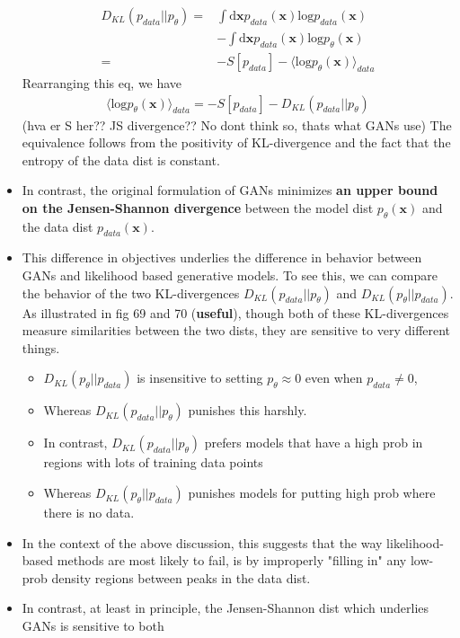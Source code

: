 \documentclass[norsk,a4paper,11pt]{article}
\begin{document}
\begin{itemize}
\begin{align}
		D_{KL} (p_{data}||p_\theta) =& \int \text{d} \bm{x} p_{data}(\bm{x}) \text{log} p_{data} (\bm{x}) \\
		&- \int \text{d} \bm{x} p_{data}(\bm{x}) \text{log} p_\theta (\bm{x}) \\
		=& - S[p_{data}] - \langle \text{log} p_\theta (\bm{x}) \rangle_{data}
	\end{align}
	Rearranging this eq, we have
	\begin{align}
		\langle \text{log} p_\theta (\bm{x}) \rangle_{data} = - S[p_{data}] - D_{KL} (p_{data}||p_\theta)
	\end{align}
	(hva er S her?? JS divergence?? No dont think so, thats what GANs use) The equivalence follows from the positivity of KL-divergence and the fact that the entropy of the data dist is constant. 
	\item In contrast, the original formulation of GANs minimizes \textbf{an upper bound on the Jensen-Shannon divergence} between the model dist $p_\theta(\bm{x})$ and the data dist $p_{data} (\bm{x})$. 
	\item This difference in objectives underlies the difference in behavior between GANs and likelihood based generative models. To see this, we can compare the behavior  of the two KL-divergences $D_{KL}(p_{data}|| p_\theta)$ and $D_{KL}(p_\theta || p_{data})$. As illustrated in fig 69 and 70 (\textbf{useful}), though both of these KL-divergences measure similarities between the two dists, they are sensitive to very different things.
	\begin{itemize}
		\item $D_{KL}(p_\theta || p_{data})$ is insensitive to setting $p_\theta \approx 0$ even when $p_{data} \neq 0$,  
		\item Whereas $D_{KL}(p_{data}|| p_\theta)$ punishes this harshly.
		\item In contrast, $D_{KL}(p_{data}|| p_\theta)$ prefers models that have a high prob in regions with lots of training data points 
		\item Whereas $D_{KL}(p_\theta || p_{data})$ punishes models for putting high prob where there is no data.
	\end{itemize} 
	\item In the context of the above discussion, this suggests that the way likelihood-based methods are most likely to fail, is by improperly "filling in" any low-prob density regions between peaks in the data dist.
	\item In contrast, at least in principle, the Jensen-Shannon dist which underlies GANs is sensitive to both 

\end{itemize}
\end{document}
